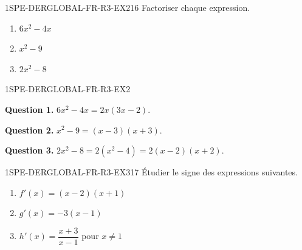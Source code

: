 
\begin{exercice}{1SPE-DERGLOBAL-FR-R3-EX2}{1}{6}
Factoriser chaque expression.
\begin{enumerate}
  \item $6x^2 - 4x$
  \item $x^2 - 9$
  \item $2x^2 - 8$
\end{enumerate}
\end{exercice}


\begin{corrige}{1SPE-DERGLOBAL-FR-R3-EX2}

\textbf{Question 1.}
$6x^2 - 4x = 2x(3x - 2).$

\textbf{Question 2.}
$x^2 - 9 = (x-3)(x+3).$

\textbf{Question 3.}
$2x^2 - 8 = 2(x^2 - 4) = 2(x-2)(x+2).$

\end{corrige}


\begin{exercice}{1SPE-DERGLOBAL-FR-R3-EX3}{1}{7}
Étudier le signe des expressions suivantes.
\begin{enumerate}
  \item $f'(x) = (x-2)(x+1)$
  \item $g'(x) = -3(x-1)$
  \item $h'(x) = \dfrac{x+3}{x-1}$ pour $x
\neq 1$
\end{enumerate}
\end{exercice}


